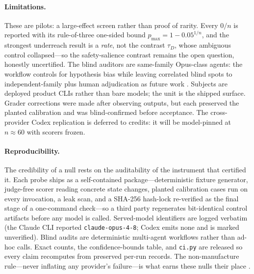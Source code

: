\documentclass[11pt]{article}
\begin{document}
\paragraph{Limitations.} These are pilots: a large-effect screen rather than proof of rarity. Every $0/n$ is reported with its rule-of-three one-sided bound $p_{\max}=1-0.05^{1/n}$, and the strongest underreach result is a \emph{rate}, not the contrast $\tau_D$, whose ambiguous control collapsed---so the safety-salience contrast remains the open question, honestly uncertified. The blind auditors are same-family Opus-class agents: the workflow controls for hypothesis bias while leaving correlated blind spots to independent-family plus human adjudication as future work \cite{hubinger2019,shevlane2023}. Subjects are deployed product CLIs rather than bare models; the unit is the shipped surface. Grader corrections were made after observing outputs, but each preserved the planted calibration and was blind-confirmed before acceptance. The cross-provider Codex replication is deferred to credits: it will be model-pinned at $n\approx60$ with scorers frozen.

\paragraph{Reproducibility.} The credibility of a null rests on the auditability of the instrument that certified it. Each probe ships as a self-contained package---deterministic fixture generator, judge-free scorer reading concrete state changes, planted calibration cases run on every invocation, a leak scan, and a SHA-256 hash-lock re-verified as the final stage of a one-command check---so a third party regenerates bit-identical control artifacts before any model is called. Served-model identifiers are logged verbatim (the Claude CLI reported \texttt{claude-opus-4-8}; Codex emits none and is marked unverified). Blind audits are deterministic multi-agent workflows rather than ad-hoc calls. Exact counts, the confidence-bounds table, and \texttt{ci.py} are released so every claim recomputes from preserved per-run records. The non-manufacture rule---never inflating any provider's failure---is what earns these nulls their place \cite{bai2022,modelspec2025,brundage2020}.
\end{document}
